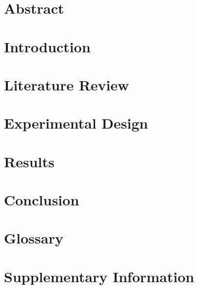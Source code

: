 \documentclass[a4paper, english, twoside, 12pt]{article}
\begin{document}
%

\thispagestyle{empty}

\pagebreak
\restoregeometry
{}

\listoftodos

\pagebreak

\glsunsetall
\tableofcontents
\listoffigures
\glsresetall
\pagebreak

\section{Abstract}

\pagebreak
\section{Introduction}

\pagebreak
\section{Literature Review}

\pagebreak
\section{Experimental Design}

\pagebreak
\section{Results}

%
\pagebreak
\section{Conclusion}

\pagebreak

\pagebreak
\begin{appendices} 
	\section{Glossary}
	\printglossaries
	\section{Supplementary Information}
	
\end{appendices}
\end{document}

